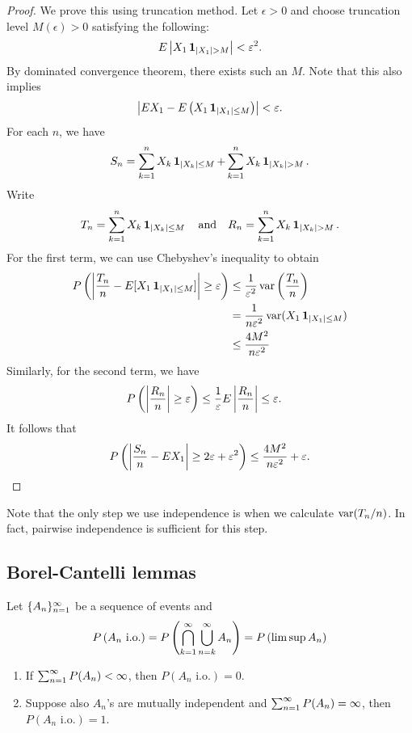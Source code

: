 \documentclass[a4paper]{article}
\begin{document}
\begin{proof}
  We prove this using truncation method.
  Let $\epsilon > 0$ and choose truncation level $M (\epsilon) > 0$ 
  satisfying the following:
  \begin{align*}
    E \left\lvert X_1 \operatorname{\mathbf{1}}_{\left\lvert X_1\right\rvert > M}\right\rvert < \varepsilon^2.
  \end{align*}
  By dominated convergence theorem, there exists such an $M$. 
  Note that this also implies 
  \[
  \left\lvert E X_1 - E \left( X_1 \operatorname{\mathbf{1}}_{\left\lvert X_1\right\rvert \leq M} \right)\right\rvert < \varepsilon.
  \]
  For each $n$, we have 
  \[
  S_n = \sum_{k=1}^n X_k \operatorname{\mathbf{1}}_{\left\lvert X_k\right\rvert \leq M} + 
  \sum_{k=1}^n X_k \operatorname{\mathbf{1}}_{\left\lvert X_k\right\rvert > M}.
  \]
  Write
  \[
  T_n = \sum_{k=1}^n X_k \operatorname{\mathbf{1}}_{\left\lvert X_k\right\rvert \leq M} \quad
  \text{and} \quad
  R_n = \sum_{k=1}^n X_k \operatorname{\mathbf{1}}_{\left\lvert X_k\right\rvert > M}.
  \]
  For the first term, we can use Chebyshev's inequality to obtain
  \begin{align*}
    P \left( \left\lvert \frac{T_n}{n} - 
    E [X_1 \operatorname{\mathbf{1}}_{\left\lvert X_1\right\rvert \leq M}]\right\rvert \geq \varepsilon \right)  
    &\leq \frac{1}{\varepsilon^2} \operatorname{var} \left( \frac{T_n}{n} \right)\\
    &= \frac{1}{n \varepsilon^2} \operatorname{var} (X_1 \operatorname{\mathbf{1}}_{\left\lvert X_1\right\rvert \leq M})  \\
    &\leq \frac{4 M^2}{n \varepsilon^2}
  \end{align*}
  Similarly, for the second term, we have 
  \begin{align*}
    P \left( \left\lvert \frac{R_n}{n}\right\rvert \geq \varepsilon \right) 
    &\leq \frac{1}{\varepsilon} E \left\lvert \frac{R_n}{n}\right\rvert \leq \varepsilon.
  \end{align*}
  It follows that 
  \[
  P \left( \left\lvert \frac{S_n}{n} - E X_1\right\rvert \geq 
  2 \varepsilon + \varepsilon^2 \right) 
  \leq \frac{4 M^2}{n \varepsilon^2} + \varepsilon.
  \]
\end{proof}

\begin{remark}
  Note that the only step we use independence is when we calculate 
  $\operatorname{var} (T_n / n)$. In fact, pairwise independence is sufficient 
  for this step.
\end{remark}

\subsection{Borel-Cantelli lemmas}

\begin{thm}
  Let $\{ A_n \}_{n=1}^\infty$ be a sequence of events and 
  \[
  P \left( A_n \text{ i.o.} \right)
  = P \left( \bigcap_{k=1}^\infty \bigcup_{n=k}^\infty A_n \right)
  = P \left( \limsup A_n \right)
  \]
  \begin{enumerate}
    \item If $\sum_{n=1}^\infty P (A_n) < \infty$, then 
    $P \left( A_n \text{ i.o.} \right) = 0$.

    \item Suppose also $A_n$'s are mutually independent
    and $\sum_{n=1}^\infty P (A_n) = \infty$, then 
    $P \left( A_n \text{ i.o.} \right) = 1$.
  \end{enumerate}
\end{thm}
\end{document}
